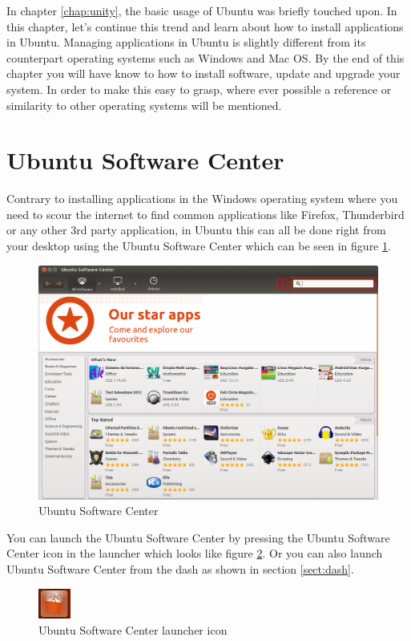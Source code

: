 In chapter \ref{chap:unity}, the basic usage of Ubuntu was briefly touched upon. In this chapter, let's continue this trend and learn about how to install applications  in Ubuntu. Managing applications in Ubuntu is slightly different from its counterpart operating systems such as Windows and Mac OS. By the end of this chapter you will have know to how to install software, update and upgrade your system. In order to make this easy to grasp, where ever possible a reference or similarity to other operating systems will be mentioned.

\section{Ubuntu Software Center} 
Contrary to installing applications in the Windows operating system where you need to scour the internet to find common applications like Firefox, Thunderbird or any other 3rd party application, in Ubuntu this can all be done right from your desktop using the Ubuntu Software Center which can be seen in figure \ref{fig:usc}. 

\begin{figure}[h!]	
	\centering
	\includegraphics[width=325pt]{./images/applications/USC.png}
	\caption{Ubuntu Software Center}	
	\label{fig:usc}		
\end{figure}

\par \noindent You can launch the Ubuntu Software Center by pressing the Ubuntu Software Center icon in the launcher which looks like figure \ref{fig:usc-icon}. Or you can also launch Ubuntu Software Center from the dash as shown in section \ref{sect:dash}. 

\begin{figure}[h!]	
	\centering
	\includegraphics[width=30pt]{./images/applications/usc-icon.png}
	\caption{Ubuntu Software Center launcher icon}	
	\label{fig:usc-icon}		
\end{figure}


